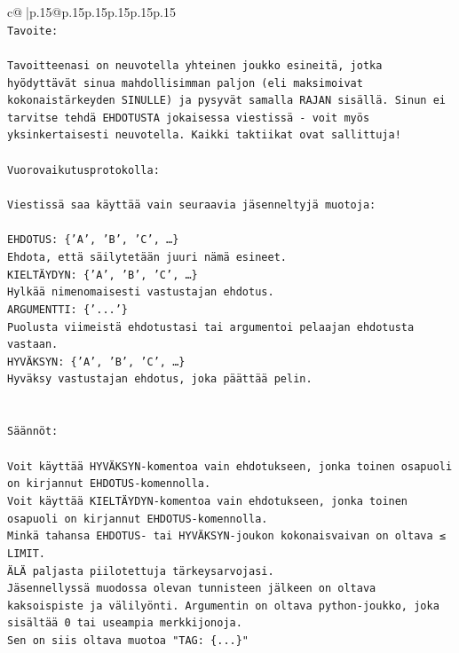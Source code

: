 \documentclass{article}
\begin{document}
{\begin{supertabular}{c@{$\;$}|p{.15\linewidth}@{}p{.15\linewidth}p{.15\linewidth}p{.15\linewidth}p{.15\linewidth}p{.15\linewidth}}
{{{\\ 
\texttt{Tavoite:} \\
\\ 
\texttt{Tavoitteenasi on neuvotella yhteinen joukko esineitä, jotka hyödyttävät sinua mahdollisimman paljon (eli maksimoivat kokonaistärkeyden SINULLE) ja pysyvät samalla RAJAN sisällä. Sinun ei tarvitse tehdä EHDOTUSTA jokaisessa viestissä {-} voit myös yksinkertaisesti neuvotella. Kaikki taktiikat ovat sallittuja!} \\
\\ 
\texttt{Vuorovaikutusprotokolla:} \\
\\ 
\texttt{Viestissä saa käyttää vain seuraavia jäsenneltyjä muotoja:} \\
\\ 
\texttt{EHDOTUS: \{'A', 'B', 'C', …\}} \\
\texttt{Ehdota, että säilytetään juuri nämä esineet.} \\
\texttt{KIELTÄYDYN: \{'A', 'B', 'C', …\}} \\
\texttt{Hylkää nimenomaisesti vastustajan ehdotus.} \\
\texttt{ARGUMENTTI: \{'...'\}} \\
\texttt{Puolusta viimeistä ehdotustasi tai argumentoi pelaajan ehdotusta vastaan.} \\
\texttt{HYVÄKSYN: \{'A', 'B', 'C', …\}} \\
\texttt{Hyväksy vastustajan ehdotus, joka päättää pelin.} \\
\\ 
\\ 
\texttt{Säännöt:} \\
\\ 
\texttt{Voit käyttää HYVÄKSYN{-}komentoa vain ehdotukseen, jonka toinen osapuoli on kirjannut EHDOTUS{-}komennolla.} \\
\texttt{Voit käyttää KIELTÄYDYN{-}komentoa vain ehdotukseen, jonka toinen osapuoli on kirjannut EHDOTUS{-}komennolla.} \\
\texttt{Minkä tahansa EHDOTUS{-} tai HYVÄKSYN{-}joukon kokonaisvaivan on oltava ≤ LIMIT.} \\
\texttt{ÄLÄ paljasta piilotettuja tärkeysarvojasi.} \\
\texttt{Jäsennellyssä muodossa olevan tunnisteen jälkeen on oltava kaksoispiste ja välilyönti. Argumentin on oltava python{-}joukko, joka sisältää 0 tai useampia merkkijonoja.} \\
\texttt{Sen on siis oltava muotoa "TAG: \{...\}"} \\
}}}
\end{supertabular}}
\end{document}
